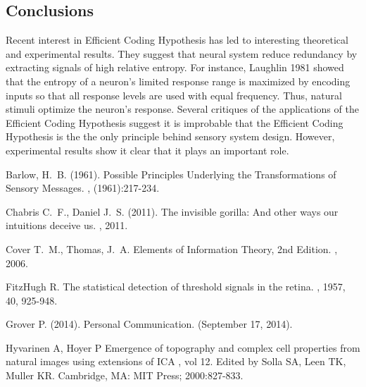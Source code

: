 \documentclass[twoside]{article}
\begin{document}
\begin{multicols}{2}
\section{Conclusions}

Recent interest in Efficient Coding Hypothesis has led to interesting theoretical and experimental results. They suggest that neural system reduce redundancy by extracting signals of high relative entropy. For instance, Laughlin 1981 showed that the entropy of a neuron’s limited response range is maximized by encoding inputs so that all response levels are used with equal frequency. Thus, natural stimuli optimize the neuron's response. Several critiques of the applications of the Efficient Coding Hypothesis suggest it is improbable that the Efficient Coding Hypothesis is the the only principle behind sensory system design. However, experimental results show it clear that it plays an important role.




\begin{thebibliography}{99} 

Barlow, H.~B. (1961).
\newblock Possible Principles Underlying the Transformations of Sensory Messages.
, (1961):217-234.

\bibitem[Chabris et. al. 2011]
Chabris C.~F., Daniel J.~S. (2011).
\newblock The invisible gorilla: And other ways our intuitions deceive us. 
, 2011.

Cover T.~M., Thomas, J.~A. 
\newblock Elements of Information Theory, 2nd Edition.
, 2006. 

\bibitem[FitzHugh 1957]
FitzHugh R.
\newblock The statistical detection of threshold signals in the retina.
, 1957, 40, 925-948.

\bibitem[Grover 2014]
Grover P. (2014).
\newblock Personal Communication. (September 17, 2014).

Hyvarinen A, Hoyer P
\newblock Emergence of topography and complex cell properties from natural images using extensions of ICA
, vol 12. Edited by Solla SA, Leen TK, Muller KR. Cambridge, MA: MIT Press; 2000:827-833.


\end{thebibliography}
\end{multicols}
\end{document}
